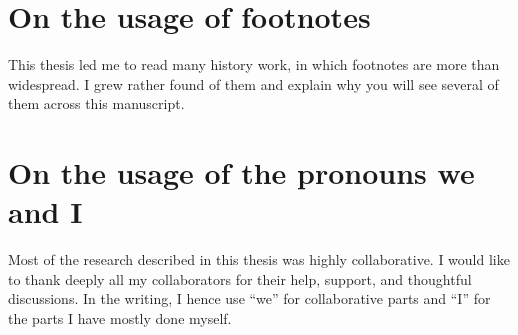 \newpage

\section*{On the usage of footnotes}

This thesis led me to read many history work, in which footnotes are more than widespread. I grew rather found of them and explain why you will see several of them across this manuscript.


\section*{On the usage of the pronouns we and I}

Most of the research described in this thesis was highly collaborative.
I would like to thank deeply all my collaborators for their help, support, and thoughtful discussions.
In the writing, I hence use ``we'' for collaborative parts and ``I'' for the parts I have mostly done myself.






















